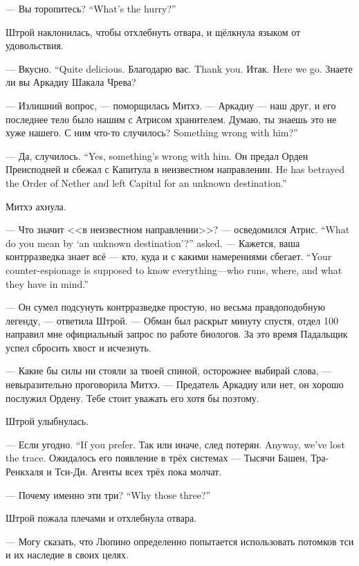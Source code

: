 {--- Вы торопитесь?}
{``What's the hurry?''}

Штрой наклонилась, чтобы отхлебнуть отвара, и щёлкнула языком от удовольствия.

{--- Вкусно.}
{``Quite delicious.}
{Благодарю вас.}
{Thank you.}
{Итак.}
{Here we go.}
Знаете ли вы Аркадиу Шакала Чрева?

--- Излишний вопрос, --- поморщилась Митхэ.
--- Аркадиу --- наш друг, и его последнее тело было нашим с Атрисом хранителем.
Думаю, ты знаешь это не хуже нашего.
{С ним что-то случилось?}
{Something wrong with him?''}

{--- Да, случилось.}
{``Yes, something's wrong with him.}
{Он предал Орден Преисподней и сбежал с Капитула в неизвестном направлении.}
{He has betrayed the Order of Nether and left Capitul for an unknown destination.''}

Митхэ ахнула.

{--- Что значит <<в неизвестном направлении>>? --- осведомился Атрис.}
{``What do you mean by `an unknown destination'?'' \Aatris{} asked.}
{--- Кажется, ваша контрразведка знает всё --- кто, куда и с какими намерениями сбегает.}
{``Your counter-espionage is supposed to know everything---who runs, where, and what they have in mind.''}

--- Он сумел подсунуть контрразведке простую, но весьма правдоподобную легенду, --- ответила Штрой.
--- Обман был раскрыт минуту спустя, отдел 100 направил мне официальный запрос по работе биологов.
За это время Падальщик успел сбросить хвост и исчезнуть.

--- Какие бы силы ни стояли за твоей спиной, осторожнее выбирай слова, --- невыразительно проговорила Митхэ.
--- Предатель Аркадиу или нет, он хорошо послужил Ордену.
Тебе стоит уважать его хотя бы поэтому.

Штрой улыбнулась.

{--- Если угодно.}
{``If you prefer.}
{Так или иначе, след потерян.}
{Anyway, we've lost the trace.}
Ожидалось его появление в трёх системах --- Тысячи Башен, Тра-Ренкхаля и Тси-Ди.
Агенты всех трёх пока молчат.

{--- Почему именно эти три?}
{``Why those three?''}

Штрой пожала плечами и отхлебнула отвара.

--- Могу сказать, что Люпино определенно попытается использовать потомков тси и их наследие в своих целях.

